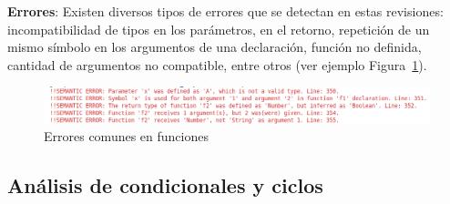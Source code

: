 \documentclass{llncs}
\begin{document}
\textbf{Errores}: Existen diversos tipos de errores que se detectan en estas revisiones: incompatibilidad de tipos en los parámetros, en el retorno, repetición de un 
mismo símbolo en los argumentos de una declaración, función no definida, cantidad de argumentos no compatible, entre otros (ver ejemplo Figura~\ref{fig:errores_3}).
\begin{figure}[h]
\centering
\includegraphics[width=1\textwidth]{images/func_errors.png}
\caption{Errores comunes en funciones}
\label{fig:errores_3}
\end{figure}

\subsection{Análisis de condicionales y ciclos}
\end{document}
